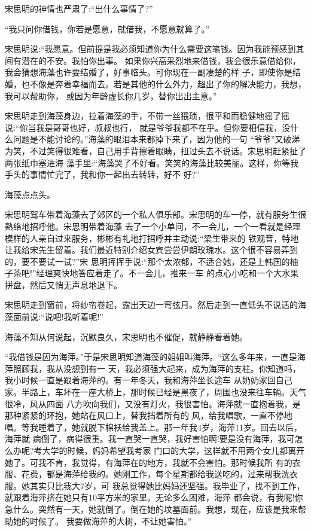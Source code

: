 \documentclass[11pt,a4paper,onecolumn]{article}
\begin{document}
宋思明的神情也严肃了:``出什么事情了?''

``我只问你借钱，你若是愿意，就借我，不愿意就算了。''

宋思明说:``我愿意。但前提是我必须知道你为什么需要这笔钱。因为我能预感到其间有潜在的不安。我怕你出事。
如果你兴高采烈地来借钱，我会很乐意借给你，我会猜想海藻也许要结婚了，好事临头。可你现在一副凄楚的样
子，即使你是结婚，也不像是奔着幸福而去。若是其他的什么外力，超出了你的解决能力，我想，我可以帮助你，
或因为年龄虚长你几岁，替你出出主意。''

宋思明走到海藻身边，拉着海藻的手，不带一丝猥琐，很平和而稳健地摇了摇说:``你当我是哥哥也好，叔叔也行，
就是爷爷我都不在乎。但你要相信我，没什么问题是不能讨论的。''海藻的眼泪本来都掉下来了，因为他的一句
``爷爷''又破涕为笑，不过笑得很难看，自己用手背擦着眼睛，扭过头去不说话。宋思明赶紧扯了两张纸巾塞进海
藻手里:``海藻哭了不好看。笑笑的海藻比较美丽。这样，你等我手头的事情忙完了，我和你一起出去转转，好不
好?''

海藻点点头。

宋思明驾车带着海藻去了郊区的一个私人俱乐部。宋思明的车一停，就有服务生很熟络地招呼他。宋思明带着海藻
去了一个小单间，不一会儿，一个一看就是经理模样的人亲自过来服务，彬彬有礼地打招呼并主动说:``梁生带来的
铁观音，特地让我给宋先生留着。我们最近特别介绍女宾尝尝伊朗玫瑰水。这个很不容易弄到的，要不要试一试?''宋
思明挥挥手说:``那个太浓郁，不适合她，还是上韩国的柚子茶吧!''经理爽快地答应着走了。不一会儿，推来一车
的点心小吃和一个大水果拼盘，然后又悄无声息地退下。

宋思明走到窗前，将纱帘卷起，露出天边一弯弦月。然后走到一直低头不说话的海藻面前说:``说吧!我听着呢!''

海藻不知从何说起，沉默良久，宋思明也不催促，就静静看着她。

``我借钱是因为海萍。''于是宋思明知道海藻的姐姐叫海萍。``这么多年来，一直是海萍照顾我，我从没想到有一
天，我必须强大起来，成为海萍的支柱。你知道吗，我小时候一直是跟着海萍的。有一年冬天，我和海萍坐长途车
从奶奶家回自己家。半路上，车坏在一座大桥上，那时候已经是黑夜了，周围也没来往车辆。天气很冷，风从四面
八方吹向我们，又没有灯火，我很害怕。海萍就一直抱着我，是那种紧紧的环抱，她站在风口上，替我挡着所有的
风，给我唱歌，一直不停地唱。等我睡着了，她就脱下棉袄给我盖上。那一年我4岁，海萍11岁。回去以后，海萍就
病倒了，病得很重。我一直哭一直哭，我好害怕啊!要是没有海萍，我可怎么办呢?考大学的时候，妈妈希望我考家
门口的大学，这样就不用两个女儿都离开她了。可我不肯，我觉得，有海萍在的地方，我就不会害怕。那时候我所
有的衣服、花费，都是海萍给我的。她刚工作，每个星期都给我送吃的，过来帮我洗衣服。她其实只比我大7岁，可
我总觉得她比妈妈还坚强。我毕业了，找不到工作，就跟着海萍挤在她只有10平方米的家里。无论多么困难，海萍
都会说，有我呢!你急什么。突然有一天，她就倒了。倒在她的坟墓面前。我想，现在，应该是我来帮助她的时候了。
我要做海萍的大树，不让她害怕。''
\end{document}
